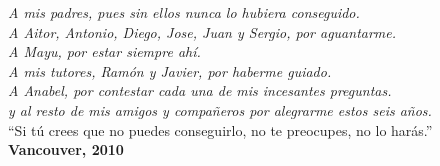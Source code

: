 \thispagestyle{empty}

\begin{flushright}
		\vspace*{7cm}
		\textit{A mis padres, pues sin ellos nunca lo hubiera conseguido.}\\
		\textit{A Aitor, Antonio, Diego, Jose, Juan y Sergio, por aguantarme.}\\
		\textit{A Mayu, por estar siempre ahí.}\\
		\textit{A mis tutores, Ramón y Javier, por haberme guiado.}\\
		\textit{A Anabel, por contestar cada una de mis incesantes preguntas.}\\
		\textit{y al resto de mis amigos y compañeros por alegrarme estos seis años.}\\
		\vspace{4cm}
		``Si tú crees que no puedes conseguirlo, no te preocupes, no lo harás.''\\
		\textbf{Vancouver, 2010}
\end{flushright}
